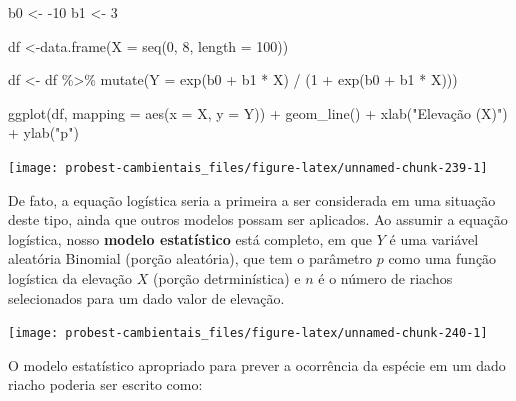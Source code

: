 \documentclass[
]{book}
\newenvironment{Shaded}{\begin{snugshade}}{\end{snugshade}}
\newcommand{\AttributeTok}[1]{\textcolor[rgb]{0.77,0.63,0.00}{#1}}
\newcommand{\DecValTok}[1]{\textcolor[rgb]{0.00,0.00,0.81}{#1}}
\newcommand{\FunctionTok}[1]{\textcolor[rgb]{0.00,0.00,0.00}{#1}}
\newcommand{\NormalTok}[1]{#1}
\newcommand{\OtherTok}[1]{\textcolor[rgb]{0.56,0.35,0.01}{#1}}
\newcommand{\SpecialCharTok}[1]{\textcolor[rgb]{0.00,0.00,0.00}{#1}}
\newcommand{\StringTok}[1]{\textcolor[rgb]{0.31,0.60,0.02}{#1}}
\begin{document}
\begin{Shaded}
\begin{Highlighting}[]
\NormalTok{b0 }\OtherTok{\textless{}{-}} \SpecialCharTok{{-}}\DecValTok{10}
\NormalTok{b1 }\OtherTok{\textless{}{-}} \DecValTok{3}

\NormalTok{df }\OtherTok{\textless{}{-}}\FunctionTok{data.frame}\NormalTok{(}\AttributeTok{X =} \FunctionTok{seq}\NormalTok{(}\DecValTok{0}\NormalTok{, }\DecValTok{8}\NormalTok{, }\AttributeTok{length =} \DecValTok{100}\NormalTok{))}

\NormalTok{df }\OtherTok{\textless{}{-}}\NormalTok{ df }\SpecialCharTok{\%\textgreater{}\%} \FunctionTok{mutate}\NormalTok{(}\AttributeTok{Y =} \FunctionTok{exp}\NormalTok{(b0 }\SpecialCharTok{+}\NormalTok{ b1 }\SpecialCharTok{*}\NormalTok{ X) }\SpecialCharTok{/}\NormalTok{ (}\DecValTok{1} \SpecialCharTok{+} \FunctionTok{exp}\NormalTok{(b0 }\SpecialCharTok{+}\NormalTok{ b1 }\SpecialCharTok{*}\NormalTok{ X)))}

\FunctionTok{ggplot}\NormalTok{(df, }\AttributeTok{mapping =} \FunctionTok{aes}\NormalTok{(}\AttributeTok{x =}\NormalTok{ X, }\AttributeTok{y =}\NormalTok{ Y)) }\SpecialCharTok{+}
  \FunctionTok{geom\_line}\NormalTok{() }\SpecialCharTok{+}
  \FunctionTok{xlab}\NormalTok{(}\StringTok{"Elevação (X)"}\NormalTok{) }\SpecialCharTok{+}
  \FunctionTok{ylab}\NormalTok{(}\StringTok{"p"}\NormalTok{)}
\end{Highlighting}
\end{Shaded}

\begin{center}\texttt{[image: probest-cambientais\_files/figure-latex/unnamed-chunk-239-1]} \end{center}

De fato, a equação logística seria a primeira a ser considerada em uma situação deste tipo, ainda que outros modelos possam ser aplicados. Ao assumir a equação logística, nosso \textbf{modelo estatístico} está completo, em que \(Y\) é uma variável aleatória Binomial (porção aleatória), que tem o parâmetro \(p\) como uma função logística da elevação \(X\) (porção detrminística) e \(n\) é o número de riachos selecionados para um dado valor de elevação.

\begin{center}\texttt{[image: probest-cambientais\_files/figure-latex/unnamed-chunk-240-1]} \end{center}

O modelo estatístico apropriado para prever a ocorrência da espécie em um dado riacho poderia ser escrito como:
\end{document}
